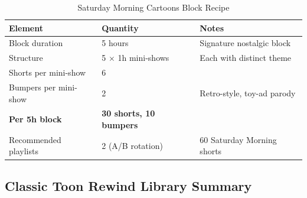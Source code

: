 \documentclass[12pt,letterpaper,twoside]{report}
\begin{document}
\begin{table}[H]
\centering
\caption{Saturday Morning Cartoons Block Recipe}
\begin{tabular}{@{}L{4cm}L{3cm}L{6cm}@{}}
\toprule
\textbf{Element} & \textbf{Quantity} & \textbf{Notes} \\
\midrule
Block duration & 5 hours & Signature nostalgic block \\
Structure & 5 $\times$ 1h mini-shows & Each with distinct theme \\
Shorts per mini-show & 6 & \\
Bumpers per mini-show & 2 & Retro-style, toy-ad parody \\
\midrule
\textbf{Per 5h block} & \textbf{30 shorts, 10 bumpers} & \\
\midrule
Recommended playlists & 2 (A/B rotation) & 60 Saturday Morning shorts \\
\bottomrule
\end{tabular}
\end{table}

\subsection{Classic Toon Rewind Library Summary}
\end{document}

